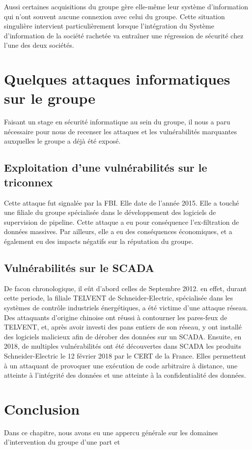 \documentclass[a4paper,12pt]{book}
\theoremstyle{break}
\begin{document}
Aussi certaines acquisitions du groupe gère elle-même leur système d’information qui n’ont souvent aucune connexion avec celui du groupe. Cette situation singulière intervient particulièrement lorsque l'intégration du Système d'information de la société rachetée va entraîner une régression de sécurité chez l'une des deux sociétés. 

\section{Quelques attaques informatiques sur le groupe}
Faisant un stage en sécurité informatique au sein du groupe, il nous a paru nécessaire pour nous de recenser les attaques et les vulnérabilités marquantes auxquelles le groupe a déjà été exposé.  
\subsection{Exploitation d'une vulnérabilités sur le triconnex}
Cette attaque fut signalée par la \ac{FBI}. Elle date de l’année 2015. Elle a touché une filiale du groupe spécialisée dans le développement des logiciels de supervision de pipeline. Cette attaque a eu pour conséquence l’ex-filtration de données massives. 
\newline
Par ailleurs, elle a eu des conséquences économiques, et a également eu des impacts négatifs sur la réputation du groupe.  

\subsection{Vulnérabilités sur le SCADA}
De facon chronologique, il eût d'abord celles de Septembre 2012. en effet, durant cette periode, la filiale TELVENT de Schneider-Electric, spécialisée dans les systèmes de contrôle industriels énergétiques, a été victime d’une attaque réseau. Des attaquants d’origine chinoise ont réussi à contourner les pares-feux de TELVENT, et, après avoir investi des pans entiers de son réseau, y ont installé des logiciels malicieux afin de dérober des données sur un SCADA.
\newline
Ensuite, en 2018, de multiples vulnérabilités ont été découvertes dans SCADA les produits Schneider-Electric le 12 février 2018 par le CERT de la France. Elles permettent à un attaquant de provoquer une exécution de code arbitraire à distance, une atteinte à l'intégrité des données et une atteinte à la confidentialité des données.

\section*{Conclusion}
Dans ce chapitre, nous avons eu une appercu générale sur les domaines d'intervention du groupe d'une part et 
\end{document}
